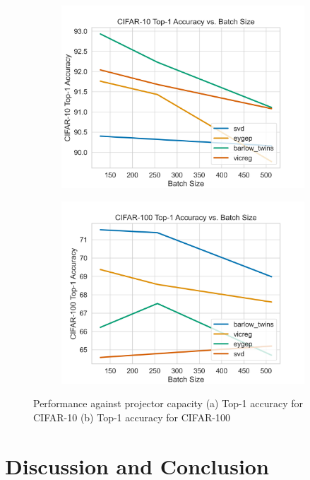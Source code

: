 \begin{figure}[h!]
     \centering
     \begin{subfigure}[b]{0.49\textwidth}
         \centering
         \includegraphics[width=\textwidth]{figures/deep_learning/SSL/cifar10_bs.png}
         \caption{}
         \label{fig:lrexpminibatch}
     \end{subfigure}
     \hfill
     \begin{subfigure}[b]{0.49\textwidth}
         \centering
         \includegraphics[width=\textwidth]{figures/deep_learning/SSL/cifar100_bs.png}
         \caption{}
                 \label{fig:xrmbminibatch}
     \end{subfigure}
        \caption{Performance against projector capacity (a) Top-1 accuracy for CIFAR-10 (b) Top-1 accuracy for CIFAR-100}
    \label{fig:sslbsablation}
\end{figure}


\section{Discussion and Conclusion}





